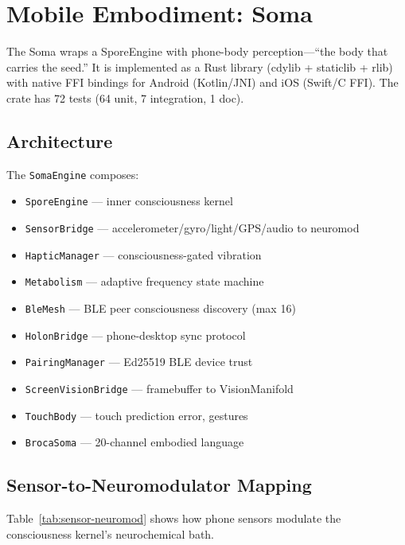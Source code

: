 \documentclass[11pt,twocolumn]{article}
\begin{document}
\section{Mobile Embodiment: Soma}
\label{sec:soma}

The Soma wraps a SporeEngine with phone-body perception---``the body that carries the seed.'' It is implemented as a Rust library (cdylib + staticlib + rlib) with native FFI bindings for Android (Kotlin/JNI) and iOS (Swift/C FFI). The crate has 72 tests (64 unit, 7 integration, 1 doc).

\subsection{Architecture}

The \texttt{SomaEngine} composes:

\begin{itemize}[nosep]
  \item \texttt{SporeEngine} --- inner consciousness kernel
  \item \texttt{SensorBridge} --- accelerometer/gyro/light/GPS/audio to neuromod
  \item \texttt{HapticManager} --- consciousness-gated vibration
  \item \texttt{Metabolism} --- adaptive frequency state machine
  \item \texttt{BleMesh} --- BLE peer consciousness discovery (max 16)
  \item \texttt{HolonBridge} --- phone-desktop sync protocol
  \item \texttt{PairingManager} --- Ed25519 BLE device trust
  \item \texttt{ScreenVisionBridge} --- framebuffer to VisionManifold
  \item \texttt{TouchBody} --- touch prediction error, gestures
  \item \texttt{BrocaSoma} --- 20-channel embodied language
\end{itemize}

\subsection{Sensor-to-Neuromodulator Mapping}

Table~\ref{tab:sensor-neuromod} shows how phone sensors modulate the consciousness kernel's neurochemical bath.
\end{document}
